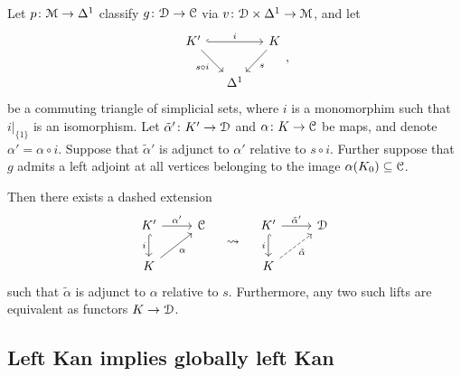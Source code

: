 \documentclass[main.tex]{subfiles}
\begin{document}
\begin{proposition}
  \label{prop:can_transport_adjunct_data_partial}
  Let $p\colon \mathcal{M} \to \Delta^{1}$ classify $g\colon \mathcal{D} \to \mathcal{C}$ via $v\colon \mathcal{D} \times\Delta^{1} \to \mathcal{M}$, and let
  \begin{equation*}
    \begin{tikzcd}[column sep=small]
      K'
      \arrow[rr, hook, "i"]
      \arrow[dr, swap, "s \circ i"]
      && K
      \arrow[dl, "s"]
      \\
      & \Delta^{1}
    \end{tikzcd},
  \end{equation*}
  be a commuting triangle of simplicial sets, where $i$ is a monomorphim such that $i|_{\{1\}}$ is an isomorphism. Let $\tilde{\alpha}'\colon K' \to \mathcal{D}$ and $\alpha\colon K \to \mathcal{C}$ be maps, and denote $\alpha' = \alpha \circ i$. Suppose that $\tilde{\alpha}'$ is adjunct to $\alpha'$ relative to $s \circ i$. Further suppose that $g$ admits a left adjoint at all vertices belonging to the image $\alpha(K_{0}) \subseteq \mathcal{C}$.

  Then there exists a dashed extension
  \begin{equation}
    \label{eq:adjunct_filling_problems_partial}
    \begin{tikzcd}
      K'
      \arrow[r, "\alpha'"]
      \arrow[d, swap, hook, "i"]
      & \category{C}
      \\
      K
      \arrow[ur, swap, "\alpha"]
    \end{tikzcd}
    \quad \rightsquigarrow \quad
    \begin{tikzcd}
      K'
      \arrow[r, "\tilde{\alpha}'"]
      \arrow[d, swap, hook, "i"]
      & \category{D}
      \\
      K
      \arrow[ur, dashed, swap, "\tilde{\alpha}"]
    \end{tikzcd}
  \end{equation}
  such that $\tilde{\alpha}$ is adjunct to $\alpha$ relative to $s$. Furthermore, any two such lifts are equivalent as functors $K \to \mathcal{D}$.
\end{proposition}


\subsection{Left Kan implies globally left Kan}
\label{ssc:left_kan_implies_globally_left_kan}
\end{document}
